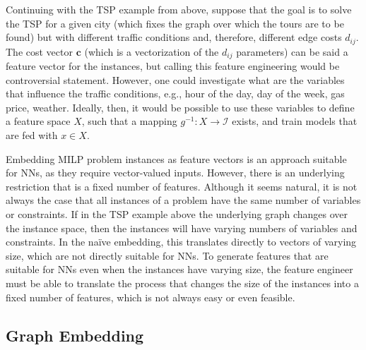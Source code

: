 Continuing with the TSP example from above, suppose that the goal is to solve the TSP for a given city (which fixes the graph over which the tours are to be found) but with different traffic conditions and, therefore, different edge costs $d_{ij}$.
The cost vector $\bm{c}$ (which is a vectorization of the $d_{ij}$ parameters) can be said a feature vector for the instances, but calling this feature engineering would be controversial statement.
However, one could investigate what are the variables that influence the traffic conditions, e.g., hour of the day, day of the week, gas price, weather.
Ideally, then, it would be possible to use these variables to define a feature space $X$, such that a mapping $g^{-1}: X \longrightarrow \mathcal{I}$ exists, and train models that are fed with $x\in X$.

Embedding MILP problem instances as feature vectors is an approach suitable for NNs, as they require vector-valued inputs.
However, there is an underlying restriction that is a fixed number of features.
Although it seems natural, it is not always the case that all instances of a problem have the same number of variables or constraints.
If in the TSP example above the underlying graph changes over the instance space, then the instances will have varying numbers of variables and constraints.
In the naïve embedding, this translates directly to vectors of varying size, which are not directly suitable for NNs.
To generate features that are suitable for NNs even when the instances have varying size, the feature engineer must be able to translate the process that changes the size of the instances into a fixed number of features, which is not always easy or even feasible.

\subsection{Graph Embedding}

